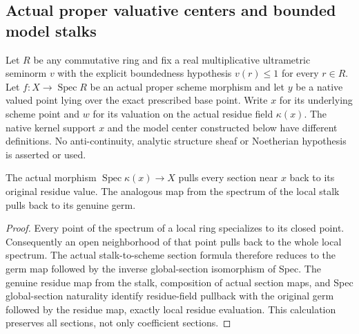 \subsection{Actual proper valuative centers and bounded model stalks}
\label{subsec:proper-native-centers}

Let $R$ be any commutative ring and fix a real multiplicative ultrametric
seminorm $v$ with the explicit boundedness hypothesis $v(r)\leq1$ for every
$r\in R$. Let $f:X\to\operatorname{Spec}R$ be an actual proper scheme
morphism and let $y$ be a native valued point lying over the exact prescribed
base point. Write $x$ for its underlying scheme point and $w$ for its
valuation on the actual residue field $\kappa(x)$.
The native kernel support $x$ and the model center constructed below have
different definitions. No anti-continuity, analytic structure sheaf or
Noetherian hypothesis is asserted or used.

\begin{lemma}
\label{scheme:actual-residue-section-pullback}
\leanok
{}
The actual morphism $\operatorname{Spec}\kappa(x)\to X$ pulls every
section near $x$ back to its original residue value. The analogous map
from the spectrum of the local stalk pulls back to its genuine germ.
\end{lemma}
\begin{proof}
Every point of the spectrum of a local ring specializes to its closed point.
Consequently an open neighborhood of that point pulls back to the whole
local spectrum. The actual stalk-to-scheme section formula therefore reduces
to the germ map followed by the inverse global-section isomorphism of Spec.
The genuine residue map from the stalk, composition of actual section maps,
and Spec global-section naturality identify residue-field pullback with the
original germ followed by the residue map, exactly local residue evaluation.
This calculation preserves all sections, not only coefficient sections.
\end{proof}

